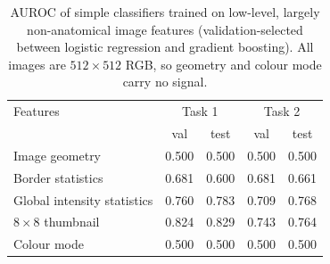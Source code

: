 \begin{table}[t]
\centering
\small
\caption{AUROC of simple classifiers trained on low-level, largely non-anatomical image features (validation-selected between logistic regression and gradient boosting). All images are $512\times512$ RGB, so geometry and colour mode carry no signal.}
\label{tab:shortcut}
\begin{tabular}{lcccc}
\toprule
Features & \multicolumn{2}{c}{Task 1} & \multicolumn{2}{c}{Task 2}\\
 & val & test & val & test\\
\midrule
Image geometry & 0.500 & 0.500 & 0.500 & 0.500 \\
Border statistics & 0.681 & 0.600 & 0.681 & 0.661 \\
Global intensity statistics & 0.760 & 0.783 & 0.709 & 0.768 \\
$8\times8$ thumbnail & 0.824 & 0.829 & 0.743 & 0.764 \\
Colour mode & 0.500 & 0.500 & 0.500 & 0.500 \\
\bottomrule
\end{tabular}
\end{table}
